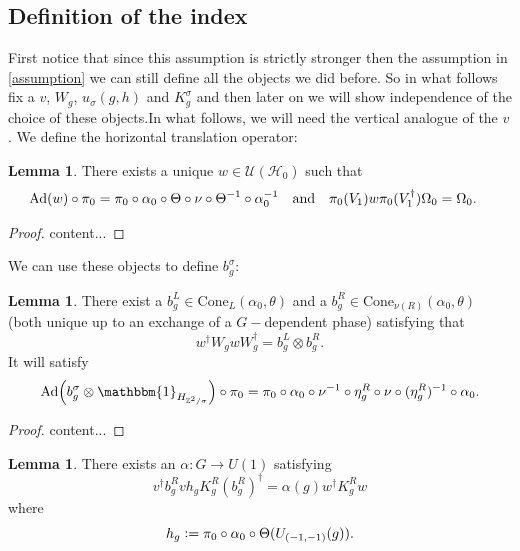 \documentclass[12pt,a4paper,twoside]{article}
\newcommand{\defeq}{\vcentcolon=}
\let\originalleft\left
\let\originalright\right
\renewcommand{\left}{\mathopen{}\mathclose\bgroup\originalleft}
\renewcommand{\right}{\aftergroup\egroup\originalright}
\newcommand{\UU}{\mathcal U}
\newcommand{\HH}{\mathcal H}
\newcommand{\ZZ}{\mathbb Z}
\newcommand{\id}{\mathbbm{1}}
\newcommand{\Ad}[1]{\textrm{Ad}\left(#1\right)}
\theoremstyle{definition}
\newtheorem{lemma}[theorem]{Lemma}
\numberwithin{equation}{section}
\begin{document}
\subsection{Definition of the index}
 First notice that since this assumption is strictly stronger then the assumption in \ref{assumption} we can still define all the objects we did before. So in what follows fix a $v$, $W_g$, $u_\sigma(g,h)$ and $K_g^\sigma$ and then later on we will show independence of the choice of these objects.In what follows, we will need the vertical analogue of the $v$. We define the horizontal translation operator:
\begin{lemma}\label{lem:Definition_w}
	There exists a unique $w\in\UU(\HH_0)$ such that
	\begin{align}
		\Ad{w}\circ\pi_0&=\pi_0\circ\alpha_0\circ\Theta\circ\nu\circ\Theta^{-1}\circ\alpha_0^{-1}&&\text{and}&\pi_0(V_1)w\pi_0(V_1^\dagger)\Omega_0&=\Omega_0.
	\end{align}
\end{lemma}
\begin{proof}
	content...
\end{proof}
 We can use these objects to define $b^\sigma_g$:
\begin{lemma}
	There exist a $b_g^L\in\textrm{Cone}_L(\alpha_0,\theta)$ and a $b_g^R\in\textrm{Cone}_{\nu(R)}(\alpha_0,\theta)$ (both unique up to an exchange of a $G-$dependent phase) satisfying that
	\begin{equation}
		w^\dagger W_g w W_g^\dagger=b_g^L\otimes b_g^R.
	\end{equation}
	It will satisfy
	\begin{equation}\label{eq:automorphismBelongingTo_b}
		\Ad{b_g^\sigma\otimes\id_{H_{\ZZ^2/\sigma}}}\circ\pi_0=\pi_0\circ\alpha_0\circ\nu^{-1}\circ\eta_g^R\circ\nu\circ(\eta_g^R)^{-1}\circ\alpha_0.
	\end{equation}
\end{lemma}
\begin{proof}
	content...
\end{proof}
\begin{lemma}\label{lem:DefinitionAlpha}
	There exists an $\alpha:G\rightarrow U(1)$ satisfying
	\begin{equation}
		v^\dagger b_g^R vh_g K_g^R (b_g^R)^\dagger=\alpha(g)w^\dagger K_g^R w
	\end{equation}
	where
	\begin{equation}
		h_g\defeq\pi_0\circ\alpha_0\circ\Theta(U_{(-1,-1)}(g)).
	\end{equation}
\end{lemma}
\end{document}
